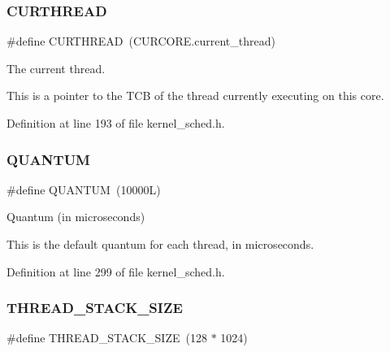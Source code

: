 \mbox{\label{group__scheduler_ga587a82c8931f0df72f43cc913ceb7e27}} 
\subsubsection{\texorpdfstring{C\+U\+R\+T\+H\+R\+E\+AD}{CURTHREAD}}
{\footnotesize\ttfamily \#define C\+U\+R\+T\+H\+R\+E\+AD~(C\+U\+R\+C\+O\+R\+E.\+current\+\_\+thread)}



The current thread. 

This is a pointer to the T\+CB of the thread currently executing on this core. 

Definition at line 193 of file kernel\+\_\+sched.\+h.

\mbox{\label{group__scheduler_gabc4f0f9abea1b5443308e4ea84b52b21}} 
\subsubsection{\texorpdfstring{Q\+U\+A\+N\+T\+UM}{QUANTUM}}
{\footnotesize\ttfamily \#define Q\+U\+A\+N\+T\+UM~(10000\+L)}



Quantum (in microseconds) 

This is the default quantum for each thread, in microseconds. 

Definition at line 299 of file kernel\+\_\+sched.\+h.

\mbox{\label{group__scheduler_ga90b7a8cb7bc3fdbd98014a3e15ee6e9a}} 
\subsubsection{\texorpdfstring{T\+H\+R\+E\+A\+D\+\_\+\+S\+T\+A\+C\+K\+\_\+\+S\+I\+ZE}{THREAD\_STACK\_SIZE}}
{\footnotesize\ttfamily \#define T\+H\+R\+E\+A\+D\+\_\+\+S\+T\+A\+C\+K\+\_\+\+S\+I\+ZE~(128 $\ast$ 1024)}



